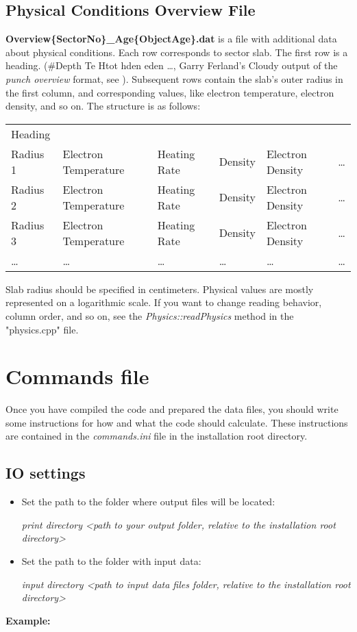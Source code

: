 \documentclass[a4paper]{article}
\begin{document}
\subsection{Physical Conditions Overview File}
\label{dataOverview}
{\bf Overview\{SectorNo\}\_Age\{ObjectAge\}.dat} is a file with additional data about physical conditions. Each row
corresponds to sector slab. The first row is a heading.
(\#Depth Te Htot hden eden \ldots, Garry Ferland's Cloudy output of the {\it punch overview}
format, see \cite{Cloudy}). Subsequent rows contain the slab's outer radius in the first column,
and corresponding values, like electron temperature, electron density, and so on. The structure is as follows:
\begin{table}[H]
    \begin{tabular}{llllll}
        Heading & & & & & \\
        Radius 1 & Electron Temperature & Heating Rate & Density & Electron Density & \ldots \\
        Radius 2 & Electron Temperature & Heating Rate & Density & Electron Density & \ldots \\
        Radius 3 & Electron Temperature & Heating Rate & Density & Electron Density & \ldots \\
        \ldots & \ldots & \ldots & \ldots & \ldots & \ldots \\
    \end{tabular}
\end{table}
Slab radius should be specified in centimeters. Physical values are mostly represented on a logarithmic scale. If you want to change reading behavior, column order, and so on, see the {\it Physics::readPhysics} method in the "physics.cpp" file.

\section{Commands file}

Once you have compiled the code and prepared the data files, you should write some instructions for how and what the code should calculate. These instructions are contained in the {\it commands.ini} file in the installation root directory.

\subsection{IO settings}
\begin{itemize}
    \item Set the path to the folder where output files will be located: \\
    \centerline{\it print directory <path to your output folder, relative to the installation root directory>}
    \item Set the path to the folder with input data: \\
    \centerline{\it input directory <path to input data files folder, relative to the installation root directory>}
\end{itemize}
{\bf Example:} \\
\end{document}
